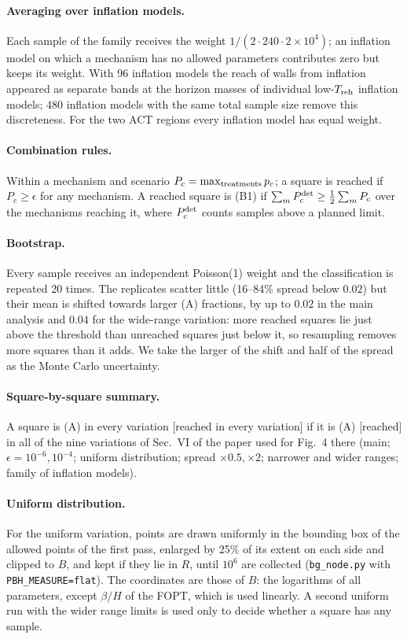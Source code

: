 \documentclass[aps,prd,onecolumn,superscriptaddress,nofootinbib,floatfix]{revtex4-2}
\newcommand{\Treh}{T_{\rm reh}}
\newcommand{\code}[1]{\texttt{#1}}
\begin{document}
\paragraph*{Averaging over inflation models.}
Each sample of the family receives the weight $1/(2\cdot240\cdot2\times10^4)$; an inflation model on which a mechanism has no allowed parameters contributes zero but keeps its weight. With 96 inflation models the reach of walls from inflation appeared as separate bands at the horizon masses of individual low-$\Treh$ inflation models; 480 inflation models with the same total sample size remove this discreteness. For the two ACT regions every inflation model has equal weight.

\paragraph*{Combination rules.}
Within a mechanism and scenario $P_c=\max_{\rm treatments}p_c$; a square is reached if $P_c\ge\epsilon$ for any mechanism. A reached square is (B1) if $\sum_m P^{\rm det}_c\ge\frac12\sum_mP_c$ over the mechanisms reaching it, where $P^{\rm det}_c$ counts samples above a planned limit.

\paragraph*{Bootstrap.}
Every sample receives an independent Poisson(1) weight and the classification is repeated 20 times. The replicates scatter little (16--84\% spread below $0.02$) but their mean is shifted towards larger (A) fractions, by up to $0.02$ in the main analysis and $0.04$ for the wide-range variation: more reached squares lie just above the threshold than unreached squares just below it, so resampling removes more squares than it adds. We take the larger of the shift and half of the spread as the Monte Carlo uncertainty.

\paragraph*{Square-by-square summary.}
A square is (A) in every variation [reached in every variation] if it is (A) [reached] in all of the nine variations of Sec.~VI of the paper used for Fig.~4 there (main; $\epsilon=10^{-6},10^{-4}$; uniform distribution; spread $\times0.5,\times2$; narrower and wider ranges; family of inflation models).

\paragraph*{Uniform distribution.}
For the uniform variation, points are drawn uniformly in the bounding box of the allowed points of the first pass, enlarged by 25\% of its extent on each side and clipped to $B$, and kept if they lie in $R$, until $10^6$ are collected (\code{bg\_node.py} with \code{PBH\_MEASURE=flat}). The coordinates are those of $B$: the logarithms of all parameters, except $\beta/H$ of the FOPT, which is used linearly. A second uniform run with the wider range limits is used only to decide whether a square has any sample.
\end{document}
